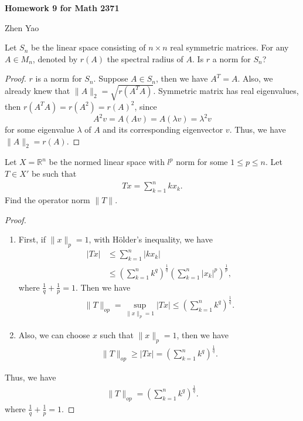 \documentclass[12pt]{article}
\begin{document}
\centerline{\bf Homework 9 for Math 2371}
\centerline{Zhen Yao}

\medskip

Let $S_n$ be the linear space consisting of $n\times n$ real symmetric matrices. For any $A \in M_n$, denoted by $r(A)$ the spectral radius of $A$. Is $r$ a norm for $S_n$?
\begin{proof}
$r$ is a norm for $S_n$. Suppose $A \in S_n$, then we have $A^T = A$. Also, we already knew that $\|A\|_2 = \sqrt{r(A^T A)}$. Symmetric matrix has real eigenvalues, then $r(A^T A) = r(A^2) = r(A)^2$, since 
$$A^2 v = A(Av) = A (\lambda v) = \lambda^2 v$$ 
for some eigenvalue $\lambda$ of $A$ and its corresponding eigenvector $v$. Thus, we have $\|A\|_2 = r(A)$.
\end{proof}

\medskip

Let $X = \mathbb{R}^n$ be the normed linear space with $l^p$ norm for some $1\leq p \leq n$. Let $T \in X'$ be such that 
\begin{align*}
    Tx = \sum^n_{k=1}k x_k.
\end{align*}
Find the operator norm $\|T\|$.
\begin{proof}
~\begin{enumerate}[label=(\arabic*)]
    \item First, if $\|x\|_p = 1$, with Hölder's inequality, we have
    \begin{align*}
        |Tx| & \leq \sum^n_{k=1} |k x_k| \\
        & \leq \left(\sum^n_{k=1} k^q \right)^{\frac{1}{q}} \left(\sum^n_{k=1} |x_k|^p \right)^{\frac{1}{p}},
    \end{align*}
    where $\frac{1}{q} + \frac{1}{p} = 1$. Then we have 
    \begin{align*}
        \|T\|_{op} = \sup_{\|x\|_p = 1}|Tx| \leq \left(\sum^n_{k=1} k^q \right)^{\frac{1}{q}}.
    \end{align*}
    
    \item Also, we can choose $x$ such that $\|x\|_p = 1$, then we have 
    \begin{align*}
        \|T\|_{op} \geq |Tx| = \left(\sum^n_{k=1} k^q \right)^{\frac{1}{q}}.
    \end{align*}
\end{enumerate}
Thus, we have 
\begin{align*}
    \|T\|_{op} = \left(\sum^n_{k=1} k^q \right)^{\frac{1}{q}}.
\end{align*}
where $\frac{1}{q} + \frac{1}{p} = 1$.
\end{proof}
\end{document}
